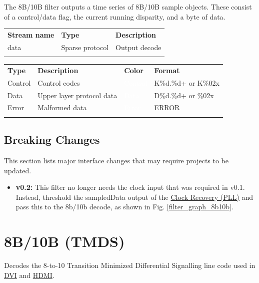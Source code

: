The 8B/10B filter outputs a time series of 8B/10B sample objects. These consist of a control/data flag, the current
running disparity, and a byte of data.

\begin{tabularx}{16cm}{llX}
\thickhline
\textbf{Stream name} & \textbf{Type} & \textbf{Description} \\
\thickhline
data & Sparse protocol & Output decode \\
\thickhline
\end{tabularx}

\begin{tabularx}{16cm}{lllX}
\thickhline
\textbf{Type} & \textbf{Description} & \textbf{Color} & \textbf{Format} \\
\thickhline
Control & Control codes & \cellcolor{control}\textcolor{white}{Control} & K\%d.\%d+ or K\%02x\\
\thinhline
Data & Upper layer protocol data & \cellcolor{data}\textcolor{white}{Data} & D\%d.\%d+ or \%02x\\
\thinhline
Error & Malformed data & \cellcolor{error}\textcolor{white}{Error} & ERROR \\
\thickhline
\end{tabularx}

\subsection{Breaking Changes}

This section lists major interface changes that may require projects to be updated.

\begin{itemize}
\item \textbf{v0.2:} This filter no longer needs the clock input that was required in v0.1.
Instead, threshold the sampledData output of the \hyperref[filter:cdrpll]{Clock Recovery (PLL)} and pass this to the
8b/10b decode, as shown in Fig. \ref{filter_graph_8b10b}.
\end{itemize}

\pagebreak
\section{8B/10B (TMDS)}
\label{filter:tmds}

Decodes the 8-to-10 Transition Minimized Differential Signalling line code used in \hyperref[filter:dvi]{DVI} and
\hyperref[filter:hdmi]{HDMI}.

